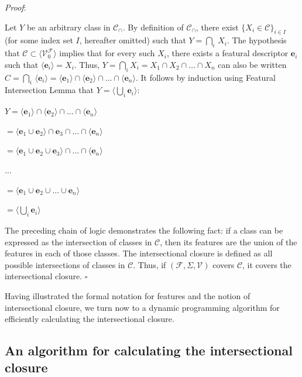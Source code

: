 \documentclass[11pt, oneside]{article}   	%
\begin{document}
\vspace{\baselineskip} \noindent \textit{Proof}:

Let $Y$ be an arbitrary class in $\mathcal C_\cap$. By definition of $\mathcal C_\cap$, there exist $\{X_i \in \mathcal C\}_{i \in I}$ (for some index set $I$, hereafter omitted) such that $Y = \bigcap_i \, X_i$. The hypothesis that $\mathcal C \subset \langle \mathcal V_0^\mathcal F \rangle $ implies that for every such $X_i$, there exists a featural descriptor $\mathbf{e}_i$ such that $\langle \mathbf{e}_i \rangle = X_i$. Thus, $Y = \bigcap_i X_i = X_1 \cap X_2 \cap \ldots \cap X_n$ can also be written $C = \bigcap_i \, \langle \mathbf{e}_i \rangle = \langle \mathbf{e}_1 \rangle \cap \langle \mathbf{e}_2 \rangle \cap \ldots \cap \langle \mathbf{e}_n \rangle$. It follows by induction using Featural Intersection Lemma that $Y = \langle \bigcup_i \mathbf{e}_i \rangle$:

$Y = \langle \mathbf{e}_1 \rangle \cap  \langle \mathbf{e}_2 \rangle \cap \ldots \cap  \langle \mathbf{e}_n \rangle$

\quad $ = \langle \mathbf{e}_1 \cup \mathbf{e}_2 \rangle \cap \mathbf{e}_3 \cap \ldots \cap \langle \mathbf{e}_n \rangle$

\quad $ = \langle \mathbf{e}_1 \cup \mathbf{e}_2 \cup \mathbf{e}_3 \rangle \cap \ldots \cap \langle \mathbf{e}_n \rangle$

\quad $\ldots$

\quad $= \langle \mathbf{e}_1 \cup \mathbf{e}_2 \cup \ldots \cup \mathbf{e}_n \rangle$

\quad $= \langle \bigcup_i  \mathbf{e}_i \rangle$

\vspace{\baselineskip} \noindent The preceding chain of logic demonstrates the following fact: if a class can be expressed as the intersection of classes in $\mathcal C$, then its features are the union of the features in each of those classes. The intersectional closure is defined as all possible intersections of classes in $\mathcal C$. Thus, if $(\mathcal F, \Sigma, \mathcal V)$ covers $\mathcal C$, it covers the intersectional closure. $\square$

Having illustrated the formal notation for features and the notion of intersectional closure, we turn now to a dynamic programming algorithm for efficiently calculating the intersectional closure.

\subsection{An algorithm for calculating the intersectional closure}
\end{document}
